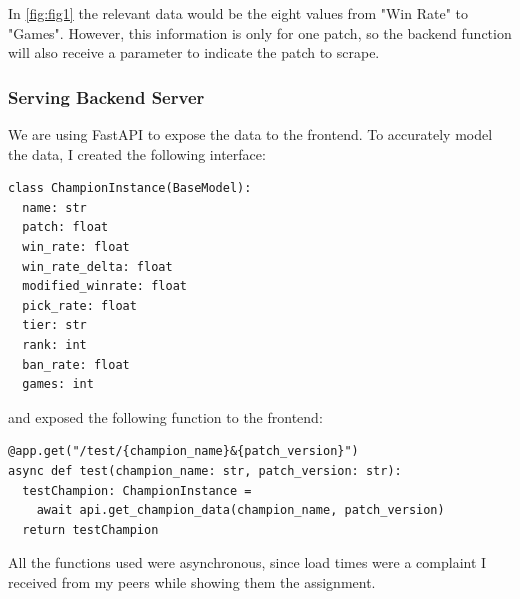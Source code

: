 \documentclass{article}
\begin{document}
In \autoref{fig:fig1} the relevant data would be the eight values from "Win Rate"
to "Games". However, this information is only for one patch, so the backend
function will also receive a parameter to indicate the patch to scrape.

\subsubsection{Serving Backend Server} 
\label{subsubsec:Serving Backend Server}

We are using FastAPI to expose the data to the frontend. 
To accurately model the data, I created the following interface:

\begin{lstlisting}[language=Python3]
class ChampionInstance(BaseModel):
  name: str
  patch: float
  win_rate: float
  win_rate_delta: float
  modified_winrate: float
  pick_rate: float
  tier: str
  rank: int
  ban_rate: float
  games: int
\end{lstlisting}

and exposed the following function to the frontend:

\begin{lstlisting}[language=Python3]
@app.get("/test/{champion_name}&{patch_version}")
async def test(champion_name: str, patch_version: str):
  testChampion: ChampionInstance = 
    await api.get_champion_data(champion_name, patch_version)
  return testChampion
\end{lstlisting}

All the functions used were asynchronous, since load times were a complaint 
I received from my peers while showing them the assignment.





\begin{refcontext}[sorting=nyt]
\printbibliography
\end{refcontext}
\end{document}
